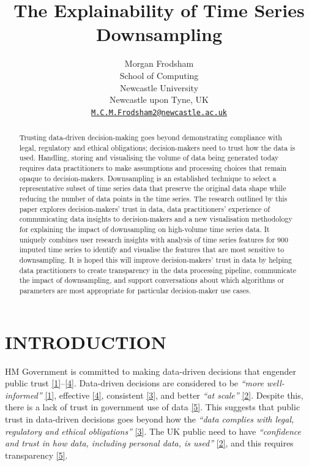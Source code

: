 \documentclass{article}
\title{The Explainability of Time Series Downsampling}
\author{
    Morgan Frodsham
   \\
    School of Computing \\
    Newcastle University \\
  Newcastle upon Tyne, UK \\
  \texttt{\href{mailto:M.C.M.Frodsham2@newcastle.ac.uk}{\nolinkurl{M.C.M.Frodsham2@newcastle.ac.uk}}} \\
  }
\begin{document}
\maketitle


\begin{abstract}
Trusting data-driven decision-making goes beyond demonstrating
compliance with legal, regulatory and ethical obligations;
decision-makers need to trust how the data is used. Handling, storing
and visualising the volume of data being generated today requires data
practitioners to make assumptions and processing choices that remain
opaque to decision-makers. Downsampling is an established technique to
select a representative subset of time series data that preserve the
original data shape while reducing the number of data points in the time
series. The research outlined by this paper explores decision-makers'
trust in data, data practitioners' experience of communicating data
insights to decision-makers and a new visualisation methodology for
explaining the impact of downsampling on high-volume time series data.
It uniquely combines user research insights with analysis of time series
features for 900 imputed time series to identify and visualise the
features that are most sensitive to downsampling. It is hoped this will
improve decision-makers' trust in data by helping data practitioners to
create transparency in the data processing pipeline, communicate the
impact of downsampling, and support conversations about which algorithms
or parameters are most appropriate for particular decision-maker use
cases.
\end{abstract}


\hypertarget{introduction}{%
\section{INTRODUCTION}\label{introduction}}

HM Government is committed to making data-driven decisions that engender
public trust
\protect\hyperlink{ref-data2017}{{[}1{]}}--\protect\hyperlink{ref-data2022}{{[}4{]}}.
Data-driven decisions are considered to be \emph{``more well-informed''}
\protect\hyperlink{ref-data2017}{{[}1{]}}, effective
\protect\hyperlink{ref-data2022}{{[}4{]}}, consistent
\protect\hyperlink{ref-data2021}{{[}3{]}}, and better \emph{``at
scale''} \protect\hyperlink{ref-data2020}{{[}2{]}}. Despite this, there
is a lack of trust in government use of data
\protect\hyperlink{ref-trust}{{[}5{]}}. This suggests that public trust
in data-driven decisions goes beyond how the \emph{``data complies with
legal, regulatory and ethical obligations''}
\protect\hyperlink{ref-data2021}{{[}3{]}}. The UK public need to have
\emph{``confidence and trust in how data, including personal data, is
used''} \protect\hyperlink{ref-data2020}{{[}2{]}}, and this requires
transparency \protect\hyperlink{ref-trust}{{[}5{]}}.
\end{document}
